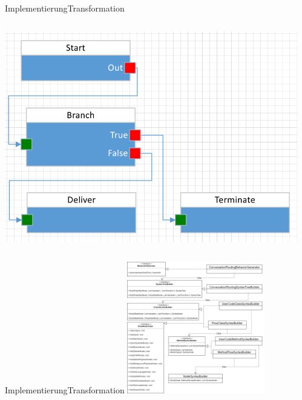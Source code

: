 \documentclass[t,aspectratio=169,divpsnames]{beamer}
\begin{document}
\begin{frame}[fragile]{Implementierung}{Transformation}
	\begin{columns}[T]
		\begin{column}{0.4\textwidth}
			\center
			\includegraphics[width=\textwidth]{img/FlowToCodeExample.png}
		\end{column}
		\begin{column}{0.6\textwidth}
			\only<2>
			{
				
			}
			{
				
			}
			{
				
			}
			{
				
			}
		\end{column}
	\end{columns}
\end{frame}

\begin{frame}{Implementierung}{Transformation}
	\center
	\includegraphics[width=0.45\textwidth]{img/TransformatorUML.png}
\end{frame}
\end{document}
